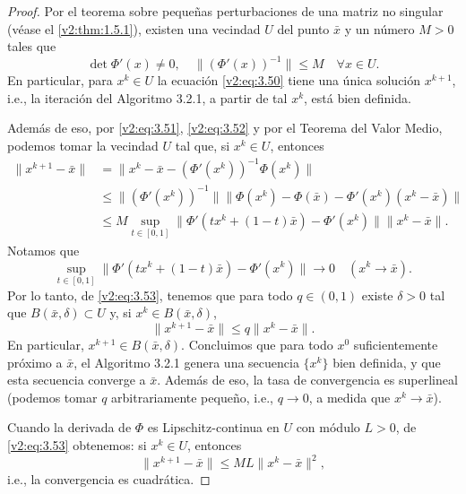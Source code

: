 \begin{proof}
    Por el teorema sobre pequeñas perturbaciones de una matriz no singular (véase el \cref{v2:thm:1.5.1}), existen una vecindad $U$ del punto $\bar{x}$ y un número $M > 0$ tales que
    \begin{equation}
        \det \Phi'(x) \neq 0, \quad \|(\Phi'(x))^{-1}\| \le M \quad \forall x \in U.
        \label{v2:eq:3.52}
    \end{equation}
    En particular, para $x^k \in U$ la ecuación \eqref{v2:eq:3.50} tiene una única solución $x^{k+1}$, i.e., la iteración del Algoritmo 3.2.1, a partir de tal $x^k$, está bien definida.
    
    Además de eso, por \eqref{v2:eq:3.51}, \eqref{v2:eq:3.52} y por el Teorema del Valor Medio, podemos tomar la vecindad $U$ tal que, si $x^k \in U$, entonces
    \begin{align}
        \|x^{k+1} - \bar{x}\| &= \|x^k - \bar{x} - (\Phi'(x^k))^{-1}\Phi(x^k)\| \nonumber \\
        &\le \|(\Phi'(x^k))^{-1}\| \|\Phi(x^k) - \Phi(\bar{x}) - \Phi'(x^k)(x^k - \bar{x})\| \nonumber \\
        &\le M \sup_{t \in [0, 1]} \|\Phi'(tx^k + (1-t)\bar{x}) - \Phi'(x^k)\| \|x^k - \bar{x}\|. \label{v2:eq:3.53}
    \end{align}
    Notamos que
    \[
        \sup_{t \in [0, 1]} \|\Phi'(tx^k + (1-t)\bar{x}) - \Phi'(x^k)\| \to 0 \quad (x^k \to \bar{x}).
    \]
    Por lo tanto, de \eqref{v2:eq:3.53}, tenemos que para todo $q \in (0, 1)$ existe $\delta > 0$ tal que $B(\bar{x}, \delta) \subset U$ y, si $x^k \in B(\bar{x}, \delta)$,
    \[
        \|x^{k+1} - \bar{x}\| \le q \|x^k - \bar{x}\|.
    \]
    En particular, $x^{k+1} \in B(\bar{x}, \delta)$. Concluimos que para todo $x^0$ suficientemente próximo a $\bar{x}$, el Algoritmo 3.2.1 genera una secuencia $\{x^k\}$ bien definida, y que esta secuencia converge a $\bar{x}$. Además de eso, la tasa de convergencia es superlineal (podemos tomar $q$ arbitrariamente pequeño, i.e., $q \to 0$, a medida que $x^k \to \bar{x}$).
    
    Cuando la derivada de $\Phi$ es Lipschitz-continua en $U$ con módulo $L > 0$, de \eqref{v2:eq:3.53} obtenemos: si $x^k \in U$, entonces
    \begin{equation}
        \|x^{k+1} - \bar{x}\| \le M L \|x^k - \bar{x}\|^2,
        \label{v2:eq:3.54}
    \end{equation}
    i.e., la convergencia es cuadrática.
\end{proof}

